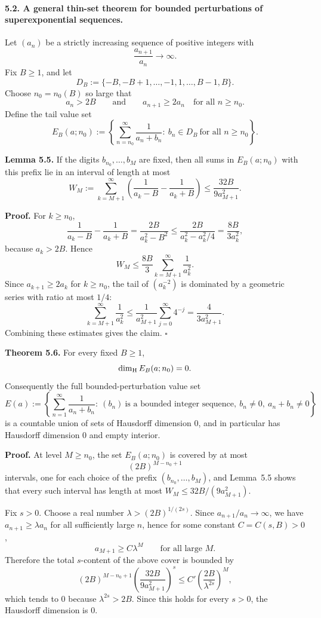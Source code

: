 \paragraph{5.2. A general thin-set theorem for bounded perturbations of superexponential sequences.}

Let $(a_n)$ be a strictly increasing sequence of positive integers with
\[
\frac{a_{n+1}}{a_n}\to\infty.
\]
Fix $B\ge 1$, and let
\[
D_B:=\{-B,-B+1,\dots,-1,1,\dots,B-1,B\}.
\]
Choose $n_0=n_0(B)$ so large that
\[
a_n>2B
\qquad\mbox{and}\qquad
a_{n+1}\ge 2a_n
\quad\mbox{for all } n\ge n_0.
\]
Define the tail value set
\[
E_{B}(a;n_0):=
\left\{
\sum_{n=n_0}^{\infty}\frac{1}{a_n+b_n}
:\ b_n\in D_B\ \mbox{for all }n\ge n_0
\right\}.
\]

\medskip
\noindent
\textbf{Lemma 5.5.}
If the digits $b_{n_0},\dots,b_M$ are fixed, then all sums in $E_B(a;n_0)$ with this prefix lie in an interval of length at most
\[
W_M:=\sum_{k=M+1}^{\infty}
\left(\frac{1}{a_k-B}-\frac{1}{a_k+B}\right)
\le \frac{32B}{9a_{M+1}^2}.
\]

\medskip
\noindent
\textbf{Proof.}
For $k\ge n_0$,
\[
\frac{1}{a_k-B}-\frac{1}{a_k+B}
=\frac{2B}{a_k^2-B^2}
\le \frac{2B}{a_k^2-a_k^2/4}
=\frac{8B}{3a_k^2},
\]
because $a_k>2B$.  Hence
\[
W_M\le \frac{8B}{3}\sum_{k=M+1}^{\infty}\frac{1}{a_k^2}.
\]
Since $a_{k+1}\ge 2a_k$ for $k\ge n_0$, the tail of $(a_k^{-2})$ is dominated by a geometric series with ratio at most $1/4$:
\[
\sum_{k=M+1}^{\infty}\frac{1}{a_k^2}
\le \frac{1}{a_{M+1}^2}\sum_{j=0}^{\infty}4^{-j}
=\frac{4}{3a_{M+1}^2}.
\]
Combining these estimates gives the claim.
\hfill $\square$

\medskip
\noindent
\textbf{Theorem 5.6.}
For every fixed $B\ge 1$,
\[
\dim_{\rm H} E_B(a;n_0)=0.
\]
Consequently the full bounded-perturbation value set
\[
E(a):=
\left\{
\sum_{n=1}^{\infty}\frac{1}{a_n+b_n}
:\ (b_n)\ \mbox{is a bounded integer sequence},\ b_n\ne 0,\ a_n+b_n\ne 0
\right\}
\]
is a countable union of sets of Hausdorff dimension $0$, and in particular has Hausdorff dimension $0$ and empty interior.

\medskip
\noindent
\textbf{Proof.}
At level $M\ge n_0$, the set $E_B(a;n_0)$ is covered by at most
\[
(2B)^{M-n_0+1}
\]
intervals, one for each choice of the prefix $(b_{n_0},\dots,b_M)$, and Lemma~5.5 shows that every such interval has length at most $W_M\le 32B/(9a_{M+1}^2)$.

Fix $s>0$.  Choose a real number $\lambda>(2B)^{1/(2s)}$.  Since $a_{n+1}/a_n\to\infty$, we have $a_{n+1}\ge \lambda a_n$ for all sufficiently large $n$, hence for some constant $C=C(s,B)>0$,
\[
a_{M+1}\ge C\lambda^M
\qquad\mbox{for all large }M.
\]
Therefore the total $s$-content of the above cover is bounded by
\[
(2B)^{M-n_0+1}\left(\frac{32B}{9a_{M+1}^2}\right)^s
\le C'\left(\frac{2B}{\lambda^{2s}}\right)^M,
\]
which tends to $0$ because $\lambda^{2s}>2B$.  Since this holds for every $s>0$, the Hausdorff dimension is $0$.

